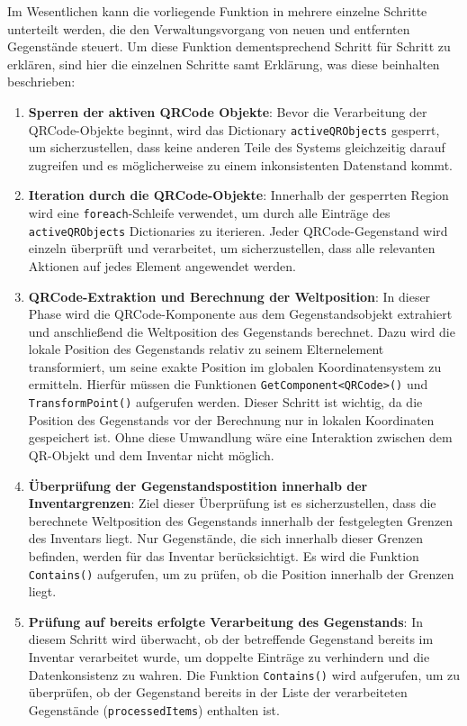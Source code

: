 Im Wesentlichen kann die vorliegende Funktion in mehrere einzelne Schritte unterteilt werden, die den Verwaltungsvorgang
von neuen und entfernten Gegenstände steuert. Um diese Funktion dementsprechend Schritt für Schritt zu erklären, sind
hier die einzelnen Schritte samt Erklärung, was diese beinhalten beschrieben:
\begin{enumerate}
    \item \textbf{Sperren der aktiven QRCode Objekte}:
    Bevor die Verarbeitung der QRCode-Objekte beginnt, wird das Dictionary \texttt{activeQRObjects} gesperrt, um
    sicherzustellen, dass keine anderen Teile des Systems gleichzeitig darauf zugreifen und es möglicherweise zu einem
    inkonsistenten Datenstand kommt.

    \item \textbf{Iteration durch die QRCode-Objekte}:
    Innerhalb der gesperrten Region wird eine \texttt{foreach}-Schleife verwendet, um durch alle Einträge des
    \texttt{activeQRObjects} Dictionaries zu iterieren. Jeder QRCode-Gegenstand wird einzeln überprüft und verarbeitet,
    um sicherzustellen, dass alle relevanten Aktionen auf jedes Element angewendet werden.

    \item \textbf{QRCode-Extraktion und Berechnung der Weltposition}:
    In dieser Phase wird die QRCode-Komponente aus dem Gegenstandsobjekt extrahiert und anschließend die Weltposition
    des Gegenstands berechnet. Dazu wird die lokale Position des Gegenstands relativ zu seinem Elternelement transformiert,
    um seine exakte Position im globalen Koordinatensystem zu ermitteln. Hierfür müssen die Funktionen
    \texttt{GetComponent<QRCode>()} und \texttt{TransformPoint()} aufgerufen werden. Dieser Schritt ist wichtig, da die
    Position des Gegenstands vor der Berechnung nur in lokalen Koordinaten gespeichert ist. Ohne diese Umwandlung wäre
    eine Interaktion zwischen dem QR-Objekt und dem Inventar nicht möglich.

    \item \textbf{Überprüfung der Gegenstandspostition innerhalb der Inventargrenzen}:
    Ziel dieser Überprüfung ist es sicherzustellen, dass die berechnete Weltposition des Gegenstands innerhalb der
    festgelegten Grenzen des Inventars liegt. Nur Gegenstände, die sich innerhalb dieser Grenzen befinden, werden für
    das Inventar berücksichtigt. Es wird die Funktion \texttt{Contains()} aufgerufen, um zu prüfen, ob die Position
    innerhalb der Grenzen liegt.

    \item \textbf{Prüfung auf bereits erfolgte Verarbeitung des Gegenstands}:
    In diesem Schritt wird überwacht, ob der betreffende Gegenstand bereits im Inventar verarbeitet wurde, um doppelte
    Einträge zu verhindern und die Datenkonsistenz zu wahren. Die Funktion \texttt{Contains()} wird aufgerufen, um zu
    überprüfen, ob der Gegenstand bereits in der Liste der verarbeiteten Gegenstände (\texttt{processedItems}) enthalten
    ist.


\end{enumerate}
